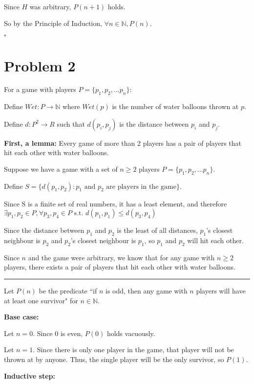 \documentclass[12pt]{article}
\newcommand{\N}{\mathbb{N}}
\begin{document}
Since $H$ was arbitrary, $P(n+1)$ holds.

So by the Principle of Induction, $\forall n \in \N, P(n)$.

\hfill $\square$

\newpage
\section*{Problem 2}

\noindent For a game with players $P = \{p_1, p_2, ... p_n\}$:

Define $Wet: P \to \N$ where $Wet(p)$ is the number of water balloons thrown at $p$.

Define $d: P^2 \to R$ such that $d(p_i, p_j)$ is the distance between $p_i$ and $p_j$.

\noindent \textbf{First, a lemma:} Every game of more than 2 players has a pair of players that hit each other with water balloons.

Suppose we have a game with a set of $n \geq 2$ players $P = \{p_1, p_2, ... p_n\}$.

Define $S = \{ d(p_1, p_2) : \text{$p_1$ and $p_2$ are players in the game} \}$.

Since S is a finite set of real numbers, it has a least element, and therefore
\( \exists p_1, p_2 \in P, \forall p_3, p_4 \in P \text{ s.t. } d(p_1, p_1) \leq d(p_3, p_4) \)

Since the distance between $p_1$ and $p_2$ is the least of all distances, $p_1$'s closest neighbour is $p_2$ and $p_2$'s closest neighbour is $p_1$, so $p_1$ and $p_2$ will hit each other.

Since $n$ and the game were arbitrary, we know that for any game with $n \geq 2$ players, there exists a pair of players that hit each other with water balloons. 

\hfill

\hrule

\hfill

Let $P(n)$ be the predicate ``if $n$ is odd, then any game with $n$ players will have at least one survivor" for $n \in \N$.

\noindent \textbf{Base case:}

Let $n = 0$. Since 0 is even, $P(0)$ holds vacuously.

Let $n = 1$. Since there is only one player in the game, that player will not be thrown at by anyone. Thus, the single player will be the only survivor, so $P(1)$.

\noindent \textbf {Inductive step:}
\end{document}
